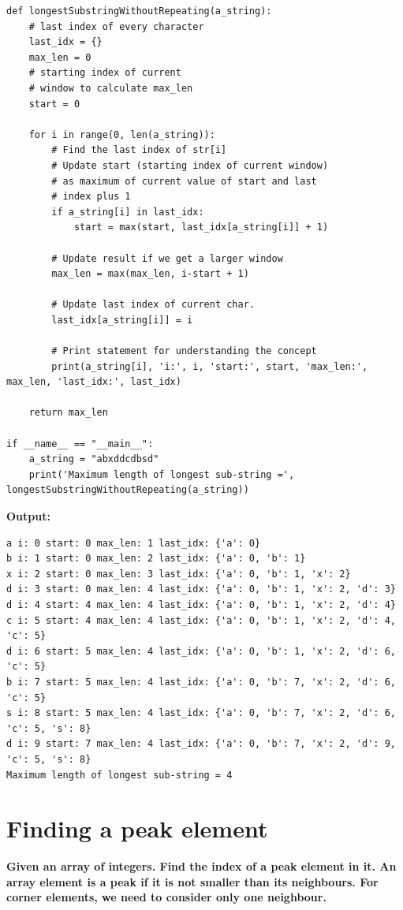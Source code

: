 \documentclass[a4paper,11pt]{book}
\begin{document}
\begin{lstlisting}
def longestSubstringWithoutRepeating(a_string):
    # last index of every character
    last_idx = {}
    max_len = 0
    # starting index of current
    # window to calculate max_len
    start = 0
 
    for i in range(0, len(a_string)):
        # Find the last index of str[i]
        # Update start (starting index of current window)
        # as maximum of current value of start and last
        # index plus 1
        if a_string[i] in last_idx:
            start = max(start, last_idx[a_string[i]] + 1)

        # Update result if we get a larger window
        max_len = max(max_len, i-start + 1)
 
        # Update last index of current char.
        last_idx[a_string[i]] = i

        # Print statement for understanding the concept
        print(a_string[i], 'i:', i, 'start:', start, 'max_len:', max_len, 'last_idx:', last_idx)
 
    return max_len

if __name__ == "__main__":
    a_string = "abxddcdbsd"
    print('Maximum length of longest sub-string =', longestSubstringWithoutRepeating(a_string))
\end{lstlisting}
\textbf{Output:}
\begin{lstlisting}
a i: 0 start: 0 max_len: 1 last_idx: {'a': 0}
b i: 1 start: 0 max_len: 2 last_idx: {'a': 0, 'b': 1}
x i: 2 start: 0 max_len: 3 last_idx: {'a': 0, 'b': 1, 'x': 2}
d i: 3 start: 0 max_len: 4 last_idx: {'a': 0, 'b': 1, 'x': 2, 'd': 3}
d i: 4 start: 4 max_len: 4 last_idx: {'a': 0, 'b': 1, 'x': 2, 'd': 4}
c i: 5 start: 4 max_len: 4 last_idx: {'a': 0, 'b': 1, 'x': 2, 'd': 4, 'c': 5}
d i: 6 start: 5 max_len: 4 last_idx: {'a': 0, 'b': 1, 'x': 2, 'd': 6, 'c': 5}
b i: 7 start: 5 max_len: 4 last_idx: {'a': 0, 'b': 7, 'x': 2, 'd': 6, 'c': 5}
s i: 8 start: 5 max_len: 4 last_idx: {'a': 0, 'b': 7, 'x': 2, 'd': 6, 'c': 5, 's': 8}
d i: 9 start: 7 max_len: 4 last_idx: {'a': 0, 'b': 7, 'x': 2, 'd': 9, 'c': 5, 's': 8}
Maximum length of longest sub-string = 4
\end{lstlisting}

\newpage
\section{Finding a peak element}

\textbf{Given an array of integers. Find the index of a peak element in it. An array element is a peak if it is not smaller than its neighbours. For corner elements, we need to consider only one neighbour. }
\vspace{5mm}
\end{document}
